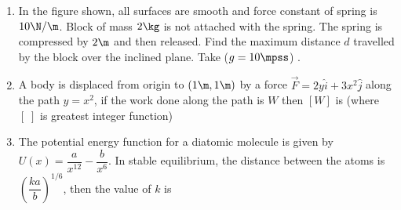 \documentclass{article}
\renewcommand{\ansint}[1]{\underline{\hspace{2cm}}}
\begin{document}
\begin{enumerate}\addtocounter{enumi}{17}
    \item In the figure shown, all surfaces are smooth and force constant of spring is $10 \N/\m$. Block of mass $2 \kg$ is not attached with the spring. The spring is compressed by $2\m$ and then released. Find the maximum distance $d$ travelled by the block over the inclined plane. Take ($g = 10 \mpss$) .\ansint{2}
    \begin{center}
    \end{center}

    \item A body is displaced from origin to $(1\m,1\m)$ by a force $\vec{F}=2y\hat{i} + 3x^2\hat{j}$ along the path $y=x^2$, if the work done along the path is $W$ then $[W]$ is (where $[\; ]$ is greatest integer function) \ansint{2}
    
    \item The potential energy function for a diatomic molecule is given by $U(x) = \dfrac{a}{x^{12}} - \dfrac{b}{x^6}$. In stable equilibrium, the distance between the atoms is $\left(\dfrac{ka}{b}\right)^{1/6}$, then the value of $k$ is \hrulefill \ansint{2}
\end{enumerate}


\vspace*{\fill}



%         
\end{document}

